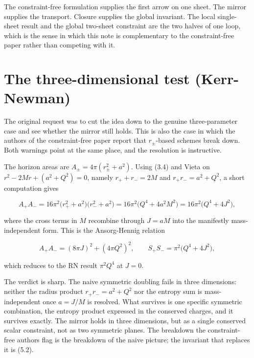 \documentclass[11pt]{article}
\begin{document}
The constraint-free formulation supplies the first arrow on one sheet. The mirror supplies the transport. Closure supplies the global invariant. The local single-sheet result and the global two-sheet constraint are the two halves of one loop, which is the sense in which this note is complementary to the constraint-free paper rather than competing with it.



\section{The three-dimensional test (Kerr-Newman)}

The original request was to cut the idea down to the genuine three-parameter case and see whether the mirror still holds. This is also the case in which the authors of the constraint-free paper report that $r_\pm$-based schemes break down. Both warnings point at the same place, and the resolution is instructive.

The horizon areas are $A_\pm = 4\pi (r_\pm^2 + a^2)$. Using (3.4) and Vieta on $r^2 - 2Mr + (a^2 + Q^2) = 0$, namely $r_+ + r_- = 2M$ and $r_+ r_- = a^2 + Q^2$, a short computation gives

\begin{equation*}
A_+ A_- = 16\pi^2 \big(r_+^2 + a^2\big)\big(r_-^2 + a^2\big)
= 16\pi^2\big(Q^4 + 4 a^2 M^2\big)
= 16\pi^2\big(Q^4 + 4 J^2\big) ,
\tag{5.1}
\end{equation*}

where the cross terms in $M$ recombine through $J = aM$ into the manifestly mass-independent form. This is the Ansorg-Hennig relation

\begin{equation*}
A_+ A_- = (8\pi J)^2 + (4\pi Q^2)^2 ,
\qquad
S_+ S_- = \pi^2\big(Q^4 + 4 J^2\big) ,
\tag{5.2}
\end{equation*}

which reduces to the RN result $\pi^2 Q^4$ at $J = 0$.

The verdict is sharp. The naive symmetric doubling fails in three dimensions: neither the radius product $r_+ r_- = a^2 + Q^2$ nor the entropy sum is mass-independent once $a = J/M$ is resolved. What survives is one specific symmetric combination, the entropy product expressed in the conserved charges, and it survives exactly. The mirror holds in three dimensions, but as a single conserved scalar constraint, not as two symmetric planes. The breakdown the constraint-free authors flag is the breakdown of the naive picture; the invariant that replaces it is (5.2).
\end{document}

